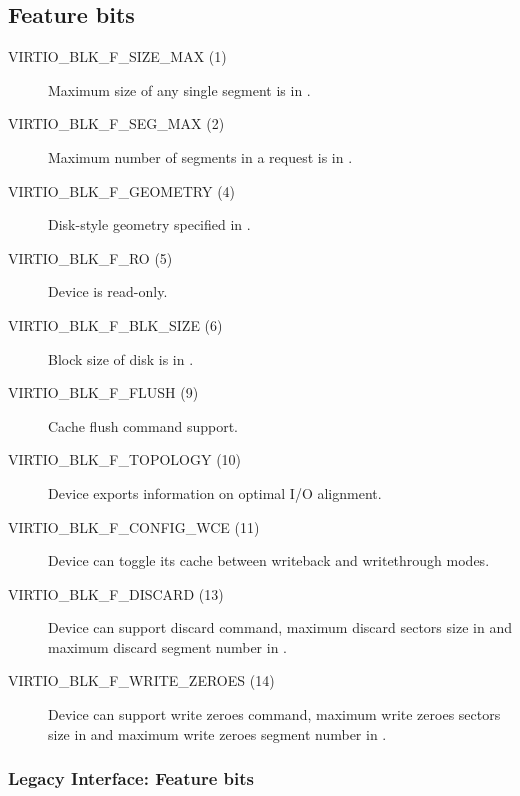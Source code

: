 \subsection{Feature bits}\label{sec:Device Types / Block Device / Feature bits}

\begin{description}
\item[VIRTIO_BLK_F_SIZE_MAX (1)] Maximum size of any single segment is
    in .

\item[VIRTIO_BLK_F_SEG_MAX (2)] Maximum number of segments in a
    request is in .

\item[VIRTIO_BLK_F_GEOMETRY (4)] Disk-style geometry specified in
    .

\item[VIRTIO_BLK_F_RO (5)] Device is read-only.

\item[VIRTIO_BLK_F_BLK_SIZE (6)] Block size of disk is in .

\item[VIRTIO_BLK_F_FLUSH (9)] Cache flush command support.

\item[VIRTIO_BLK_F_TOPOLOGY (10)] Device exports information on optimal I/O
    alignment.

\item[VIRTIO_BLK_F_CONFIG_WCE (11)] Device can toggle its cache between writeback
    and writethrough modes.

\item[VIRTIO_BLK_F_DISCARD (13)] Device can support discard command, maximum
    discard sectors size in  and maximum discard
    segment number in .

\item[VIRTIO_BLK_F_WRITE_ZEROES (14)] Device can support write zeroes command,
     maximum write zeroes sectors size in  and
     maximum write zeroes segment number in .
\end{description}

\subsubsection{Legacy Interface: Feature bits}\label{sec:Device Types / Block Device / Feature bits / Legacy Interface: Feature bits}

